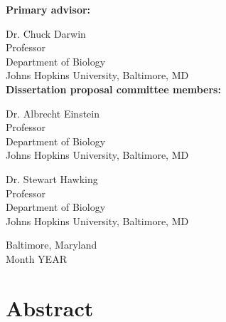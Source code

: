 \vspace{0.75in}
\begin{singlespace}

    \textbf{Primary advisor:}
    
    Dr. Chuck Darwin \\
    Professor \\
    Department of Biology \\
    Johns Hopkins University, Baltimore, MD \\

    \textbf{Dissertation proposal committee members:} 
    
    Dr. Albrecht Einstein \\
    Professor\\
    Department of Biology \\
    Johns Hopkins University, Baltimore, MD
    
    Dr. Stewart Hawking \\
    Professor\\
    Department of Biology \\
    Johns Hopkins University, Baltimore, MD 
    
\end{singlespace}

\vspace{0.75in}
\begin{center}
    Baltimore, Maryland \\  %
    Month YEAR              %
\end{center}






\newpage
{}
\setcounter{page}{2}
\section*{Abstract}

\blindtext



